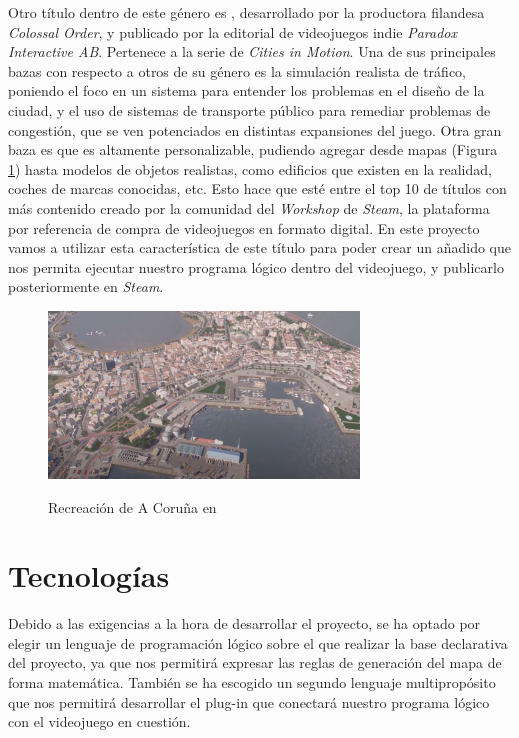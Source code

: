 Otro título dentro de este género es \citiesit, desarrollado por la productora filandesa \textit{Colossal Order}, y publicado por la editorial de videojuegos indie \textit{Paradox Interactive AB}. Pertenece a la serie de \textit{Cities in Motion\textcopyright}. Una de sus principales bazas con respecto a otros de su género es la simulación realista de tráfico, poniendo el foco en un sistema para entender los problemas en el diseño de la ciudad, y el uso de sistemas de transporte público para remediar problemas de congestión, que se ven potenciados en distintas expansiones del juego. Otra gran baza es que es altamente personalizable, pudiendo agregar desde mapas (Figura \ref{fig:cities}) hasta modelos de objetos realistas, como edificios que existen en la realidad, coches de marcas conocidas, etc. Esto hace que esté entre el top 10 de títulos con más contenido creado por la comunidad del \textit{Workshop} de \textit{Steam}, la plataforma por referencia de compra de videojuegos en formato digital. En este proyecto vamos a utilizar esta característica de este título para poder crear un añadido que nos permita ejecutar nuestro programa lógico dentro del videojuego, y publicarlo posteriormente en \textit{Steam}.

\begin{figure}[h]
	\centering
	\includegraphics[height=12em]{images/CitiesCoruna}
	\label{fig:cities}
	\caption{Recreación de A Coruña en \citiesit}
\end{figure}

\section{Tecnologías}

Debido a las exigencias a la hora de desarrollar el proyecto, se ha optado por elegir un lenguaje de programación lógico sobre el que realizar la base declarativa del proyecto, ya que nos permitirá expresar las reglas de generación del mapa de forma matemática. También se ha escogido un segundo lenguaje multipropósito que nos permitirá desarrollar el plug-in que conectará nuestro programa lógico con el videojuego en cuestión.

